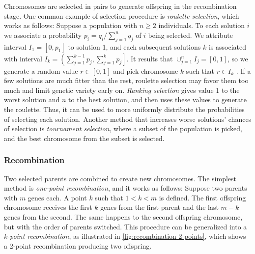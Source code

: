     Chromosomes are selected in pairs to generate offspring in the recombination stage. One common example of selection procedure is \emph{roulette selection}, which works as follows: Suppose a population with $n \geq 2$ individuals. To each solution $i$ we associate a probability $p_i = q_i / \sum_{j=1}^{n}q_j$ of $i$ being selected. We attribute interval $I_1 = [0, p_1]$ to solution 1, and each subsequent solutions $k$ is associated with interval $I_k = \left(\sum_{j=1}^{k-1}p_j, \sum_{j=1}^{k}p_j\right]$. It results that $\cup_{j=1}^{n}I_j = [0, 1]$, so we generate a random value $r \in [0, 1]$ and pick chromosome $k$ such that $r \in I_k$ \cite{CARVALHO,SASTRY2005}. If a few solutions are much fitter than the rest, roulette selection may favor them too much and limit genetic variety early on. \emph{Ranking selection} gives value 1 to the worst solution and $n$ to the best solution, and then uses these values to generate the roulette. Thus, it can be used to more uniformly distribute the probabilities of selecting each solution. Another method that increases worse solutions' chances of selection is \emph{tournament selection}, where a subset of the population is picked, and the best chromosome from the subset is selected.

\subsubsection*{Recombination}

    Two selected parents are combined to create new chromosomes. The simplest method is \emph{one-point recombination}, and it works as follows: Suppose two parents with $m$ genes each. A point $k$ such that $1 < k < m$ is defined. The first offspring chromosome receives the first $k$ genes from the first parent and the last $m - k$ genes from the second. The same happens to the second offspring chromosome, but with the order of parents switched. This procedure can be generalized into a $k$-\emph{point recombination}, as illustrated in \cref{fig:recombination 2 points}, which shows a 2-point recombination producing two offspring.

